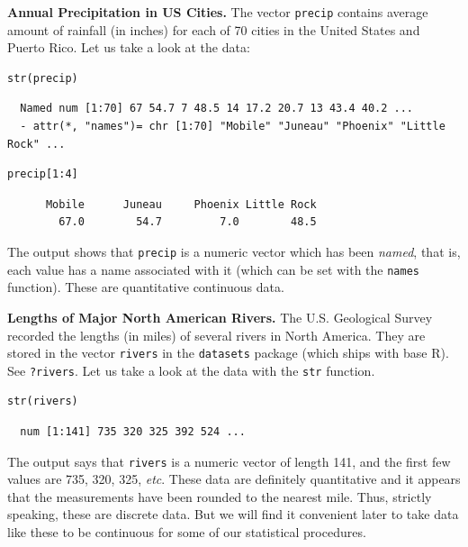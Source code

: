 \documentclass[captions=tableheading]{scrbook}
\begin{document}
\begin{example}
\textbf{Annual Precipitation in US Cities.} The vector \texttt{precip} contains average amount of rainfall (in inches) for each of 70 cities in the United States and Puerto Rico. Let us take a look at the data:


\begin{verbatim}
str(precip)
\end{verbatim}

\begin{verbatim}
  Named num [1:70] 67 54.7 7 48.5 14 17.2 20.7 13 43.4 40.2 ...
  - attr(*, "names")= chr [1:70] "Mobile" "Juneau" "Phoenix" "Little Rock" ...
\end{verbatim}


\begin{verbatim}
precip[1:4]
\end{verbatim}

\begin{verbatim}
      Mobile      Juneau     Phoenix Little Rock 
        67.0        54.7         7.0        48.5
\end{verbatim}

The output shows that \texttt{precip} is a numeric vector which has been \emph{named}, that is, each value has a name associated with it (which can be set with the \texttt{names} function). These are quantitative continuous data.

\end{example}

\begin{example}
\textbf{Lengths of Major North American Rivers.} The U.S. Geological Survey recorded the lengths (in miles) of several rivers in North America. They are stored in the vector \texttt{rivers} in the \texttt{datasets} package (which ships with base \textsf{R}). See \texttt{?rivers}. Let us take a look at the data with the \texttt{str} function.


\begin{verbatim}
str(rivers)
\end{verbatim}

\begin{verbatim}
  num [1:141] 735 320 325 392 524 ...
\end{verbatim}


The output says that \texttt{rivers} is a numeric vector of length 141, and the first few values are 735, 320, 325, \emph{etc}. These data are definitely quantitative and it appears that the measurements have been rounded to the nearest mile. Thus, strictly speaking, these are discrete data. But we will find it convenient later to take data like these to be continuous for some of our statistical procedures. 
\end{example}
\end{document}
